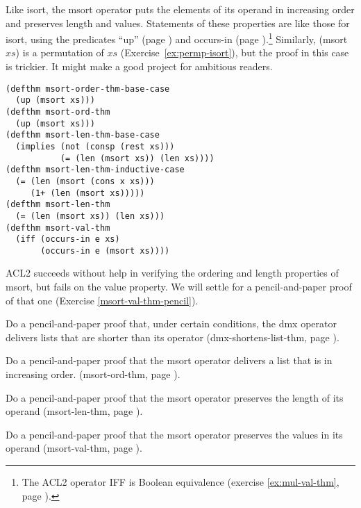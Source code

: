 Like isort, the msort operator puts the elements of its operand
in increasing order and preserves length and values.
Statements of these properties are like those for isort,
using the predicates ``up'' (page \pageref{defun:up})
and occurs-in (page \pageref{def:occurs-in}).\footnote{The
ACL2 operator IFF is
Boolean equivalence
(exercise \ref{ex:mul-val-thm}, page \pageref{def:equivalence-op}).}
Similarly, (msort $xs$) is a permutation of $xs$
(Exercise~\ref{ex:permp-isort}), but the proof in this case
is trickier. It might make a good project for ambitious readers.

\label{defthm:msort-ord}\label{defthm:msort-len}\label{defthm:msort-val}
\begin{Verbatim}
(defthm msort-order-thm-base-case
  (up (msort xs)))
(defthm msort-ord-thm
  (up (msort xs)))
(defthm msort-len-thm-base-case
  (implies (not (consp (rest xs)))
           (= (len (msort xs)) (len xs))))
(defthm msort-len-thm-inductive-case
  (= (len (msort (cons x xs)))
     (1+ (len (msort xs)))))
(defthm msort-len-thm
  (= (len (msort xs)) (len xs)))
(defthm msort-val-thm
  (iff (occurs-in e xs)
       (occurs-in e (msort xs))))
\end{Verbatim}

ACL2 succeeds without help in verifying the ordering and length
properties of msort, but fails on the value property.
We will settle for a pencil-and-paper proof of that one
(Exercise \ref{msort-val-thm-pencil}).

\begin{ExerciseList}
\Exercise
Do a pencil-and-paper proof that, under certain conditions, the dmx operator
delivers lists that are shorter than its operator
(dmx-shortens-list-thm, page \pageref{defthm:dmx-shortens-list}).

\Exercise
Do a pencil-and-paper proof that the msort operator
delivers a list that is in increasing order.
(msort-ord-thm, page \pageref{defthm:msort-ord}).

\Exercise
Do a pencil-and-paper proof that the msort operator
preserves the length of its operand
(msort-len-thm, page \pageref{defthm:msort-len}).

\Exercise
\label{msort-val-thm-pencil}
Do a pencil-and-paper proof that the msort operator
preserves the values in its operand
(msort-val-thm, page \pageref{defthm:msort-val}).
\end{ExerciseList}

